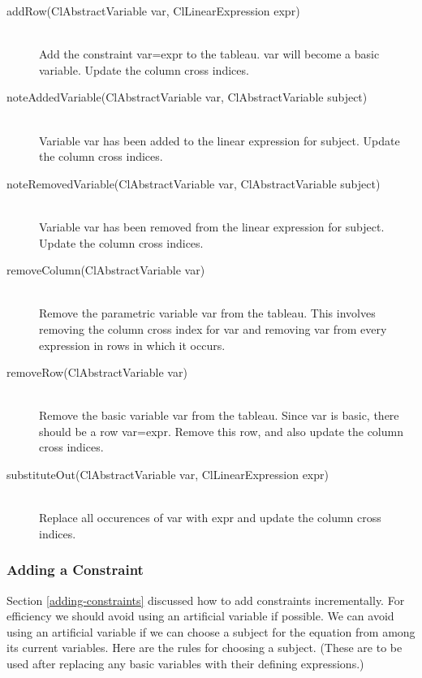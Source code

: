 \documentclass{article}
\begin{document}
\begin{description}
  

\item[{\sf addRow(ClAbstractVariable var, ClLinearExpression expr)}]  \ \\
      Add the constraint {\sf var=expr} to the tableau.  {\sf var} will
      become a basic variable.  Update the column cross indices.
      

\item[{\sf noteAddedVariable(ClAbstractVariable var, ClAbstractVariable subject)}]  \ \\
      Variable {\sf var} has been added to the linear expression for
      {\sf subject}.  Update the column cross indices.
      

\item[{\sf noteRemovedVariable(ClAbstractVariable var, ClAbstractVariable subject)}]  \ \\
      Variable {\sf var} has been removed from the linear expression for
      {\sf subject}.  Update the column cross indices.
      

\item[{\sf removeColumn(ClAbstractVariable var)}] \ \\
      Remove the parametric variable {\sf var} from the tableau.  This
      involves removing the column cross index for {\sf var} and
      removing {\sf var} from every expression in {\sf rows} in which it
      occurs.
      

\item[{\sf removeRow(ClAbstractVariable var)}] \ \\
      Remove the basic variable {\sf var} from the tableau.  Since {\sf
        var} is basic, there should be a row {\sf var=expr}.  Remove
      this row, and also update the column cross indices.
      

\item[{\sf substituteOut(ClAbstractVariable var, ClLinearExpression expr)}] \ \\
      Replace all occurences of {\sf var} with {\sf expr} and update the
      column cross indices.

\end{description}

\subsubsection{Adding a Constraint}
\label{cassowary-adding-constraints}

Section \ref{adding-constraints} discussed how to add constraints
incrementally.  For efficiency we should avoid using an artificial
variable if possible.  We can avoid using an artificial variable if we can
choose a subject for the equation from among its current variables.
Here are the rules for choosing a subject.  (These are to be used after
replacing any basic variables with their defining expressions.)  
\end{document}

